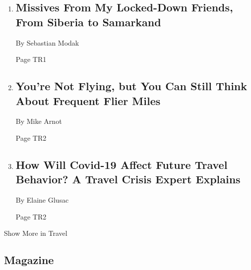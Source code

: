 \begin{enumerate}
\def\labelenumi{\arabic{enumi}.}
\item
  \href{/2020/04/13/travel/missives-from-my-locked-down-friends-from-siberia-to-samarkand.html}{}

  \hypertarget{missives-from-my-locked-down-friends-from-siberia-to-samarkand}{%
  \subsection{Missives From My Locked-Down Friends, From Siberia to
  Samarkand}\label{missives-from-my-locked-down-friends-from-siberia-to-samarkand}}

  By Sebastian Modak

  Page TR1
\item
  \href{/2020/04/14/travel/frequent-flier-miles-rewards.html}{}

  \hypertarget{youre-not-flying-but-you-can-still-think-about-frequent-flier-miles}{%
  \subsection{You're Not Flying, but You Can Still Think About Frequent
  Flier
  Miles}\label{youre-not-flying-but-you-can-still-think-about-frequent-flier-miles}}

  By Mike Arnot

  Page TR2
\item
  \href{/2020/04/15/travel/q-and-a-coronavirus-travel.html}{}

  \hypertarget{how-will-covid-19-affect-future-travel-behavior-a-travel-crisis-expert-explains}{%
  \subsection{How Will Covid-19 Affect Future Travel Behavior? A Travel
  Crisis Expert
  Explains}\label{how-will-covid-19-affect-future-travel-behavior-a-travel-crisis-expert-explains}}

  By Elaine Glusac

  Page TR2
\end{enumerate}

Show More in Travel

\hypertarget{magazine}{%
\subsection{Magazine}\label{magazine}}

